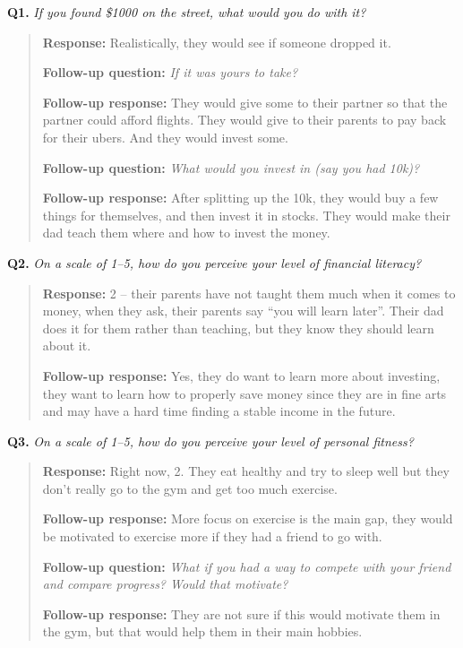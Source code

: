 \documentclass[12pt]{article}
\begin{document}
\medskip
\noindent\textbf{Q1.} \textit{If you found \$1000 on the street, what would you do with it?}

\begin{quote}
\textbf{Response:} Realistically, they would see if someone dropped it.\par
\textbf{Follow-up question:} \textit{If it was yours to take?}\par
\textbf{Follow-up response:} They would give some to their partner so that the partner could afford flights. They would give to their parents to pay back for their ubers. And they would invest some.\par
\textbf{Follow-up question:} \textit{What would you invest in (say you had 10k)?}\par
\textbf{Follow-up response:} After splitting up the 10k, they would buy a few things for themselves, and then invest it in stocks. They would make their dad teach them where and how to invest the money.\par
\end{quote}

\medskip
\noindent\textbf{Q2.} \textit{On a scale of 1--5, how do you perceive your level of financial literacy?}

\begin{quote}
\textbf{Response:} 2 -- their parents have not taught them much when it comes to money, when they ask, their parents say ``you will learn later''. Their dad does it for them rather than teaching, but they know they should learn about it.\par
\textbf{Follow-up response:} Yes, they do want to learn more about investing, they want to learn how to properly save money since they are in fine arts and may have a hard time finding a stable income in the future.\par
\end{quote}

\medskip
\noindent\textbf{Q3.} \textit{On a scale of 1--5, how do you perceive your level of personal fitness?}

\begin{quote}
\textbf{Response:} Right now, 2. They eat healthy and try to sleep well but they don't really go to the gym and get too much exercise.\par
\textbf{Follow-up response:} More focus on exercise is the main gap, they would be motivated to exercise more if they had a friend to go with.\par
\textbf{Follow-up question:} \textit{What if you had a way to compete with your friend and compare progress? Would that motivate?}\par
\textbf{Follow-up response:} They are not sure if this would motivate them in the gym, but that would help them in their main hobbies.\par
\end{quote}
\end{document}
